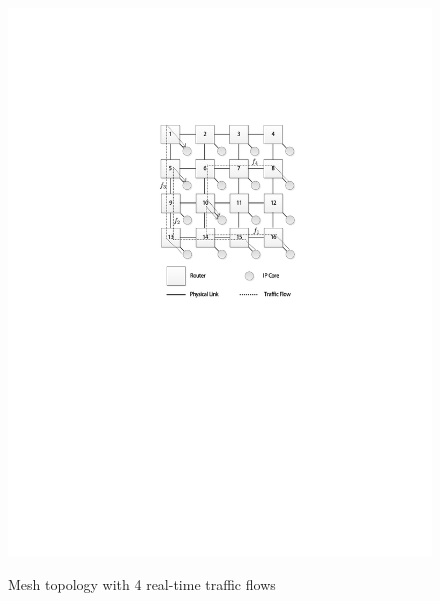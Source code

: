 \documentclass[10pt,journal]{IEEEtran}
\begin{document}
\begin{figure}
  \centering
  \includegraphics[scale=0.9]{figures/mesh.pdf}\\
  \caption{Mesh topology with 4 real-time traffic flows}\label{topology}
\end{figure}
\end{document}
